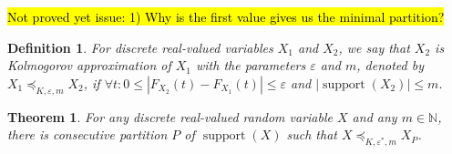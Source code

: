 \documentclass[review]{elsarticle}
\newtheorem{definition}{Definition}
\newtheorem{theorem}{Theorem}
\DeclareMathOperator{\supp}{support}
\DeclareMathOperator{\support}{support}
\begin{document}
%
%     


\hl{Not proved yet issue:
1) Why is the first value gives us the minimal partition?}


\begin{definition}
	For discrete real-valued variables $X_1$ and $X_2$, we say that $X_2$ is Kolmogorov approximation of $X_1$ with the parameters $\varepsilon$ and $m$, denoted by $X_1 \preceq_{K,\varepsilon,m} X_2$, if $\forall t\colon 0 \leq   |F_{X_2}(t)-F_{X_1}(t)| \leq \varepsilon$ and $|\support(X_2)| \leq m$. 
\end{definition}


\begin{theorem}\label{approxAsPartKolmo}
For any discrete real-valued random variable $X$ and any $m \in \mathbb{N}$, there is consecutive partition $P$ of $\supp(X)$ such that $X \preceq_{K,\varepsilon^*,m} X_P$.
\end{theorem}
\end{document}
